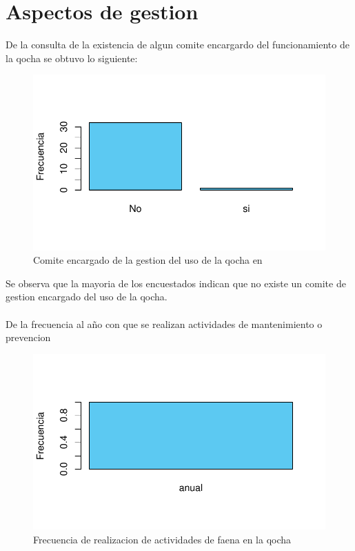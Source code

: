 \documentclass[12pt]{article}\usepackage[]{graphicx}\usepackage[]{xcolor}
\makeatletter
\def\maxwidth{ %
  \ifdim\Gin@nat@width>\linewidth
    \linewidth
  \else
    \Gin@nat@width
  \fi
}
\newenvironment{knitrout}{}{} %
\makeatother
\begin{document}
	\section{Aspectos de gestion}
	De la consulta de la existencia de algun comite encargardo del funcionamiento de la qocha se obtuvo lo siguiente:
	\begin{figure}[H]
	\centering
\begin{knitrout}
\color{fgcolor}
\includegraphics[width=\maxwidth]{figure/veintitres-1} 
\end{knitrout}
	\caption{Comite encargado de la gestion del uso de la qocha en \comunidad}
	\end{figure}
	Se observa que la mayoria de los encuestados indican que no existe un comite de gestion encargado del uso de la qocha.\\
	\\
	De la frecuencia al año con que se realizan actividades de mantenimiento o prevencion
	\begin{figure}[H]
	\centering
\begin{knitrout}
\color{fgcolor}
\includegraphics[width=\maxwidth]{figure/veinticuatro-1} 
\end{knitrout}
	\caption{Frecuencia de realizacion de actividades de faena en la qocha}
	\end{figure}
\end{document}
